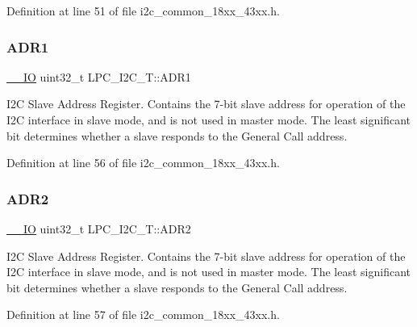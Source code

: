 Definition at line 51 of file i2c\+\_\+common\+\_\+18xx\+\_\+43xx.\+h.

\mbox{\label{struct_l_p_c___i2_c___t_ad948a871ac4d57bde1698f91ea554903}} 
\subsubsection{\texorpdfstring{A\+D\+R1}{ADR1}}
{\footnotesize\ttfamily \hyperlink{core__sc300_8h_aec43007d9998a0a0e01faede4133d6be}{\+\_\+\+\_\+\+IO} uint32\+\_\+t L\+P\+C\+\_\+\+I2\+C\+\_\+\+T\+::\+A\+D\+R1}

I2C Slave Address Register. Contains the 7-\/bit slave address for operation of the I2C interface in slave mode, and is not used in master mode. The least significant bit determines whether a slave responds to the General Call address. 

Definition at line 56 of file i2c\+\_\+common\+\_\+18xx\+\_\+43xx.\+h.

\mbox{\label{struct_l_p_c___i2_c___t_aad3c43c326c675b3c9a02936f7b906fa}} 
\subsubsection{\texorpdfstring{A\+D\+R2}{ADR2}}
{\footnotesize\ttfamily \hyperlink{core__sc300_8h_aec43007d9998a0a0e01faede4133d6be}{\+\_\+\+\_\+\+IO} uint32\+\_\+t L\+P\+C\+\_\+\+I2\+C\+\_\+\+T\+::\+A\+D\+R2}

I2C Slave Address Register. Contains the 7-\/bit slave address for operation of the I2C interface in slave mode, and is not used in master mode. The least significant bit determines whether a slave responds to the General Call address. 

Definition at line 57 of file i2c\+\_\+common\+\_\+18xx\+\_\+43xx.\+h.

\mbox{\label{struct_l_p_c___i2_c___t_a554732a259fca555bcec4201d756e945}} 
